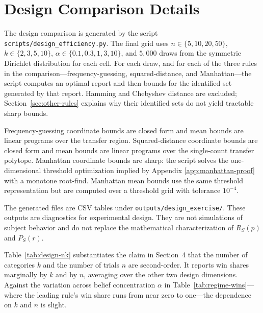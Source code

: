 \section{Design Comparison Details}
\label{app:design-details}

The design comparison is generated by the script \texttt{scripts/design\_efficiency.py}.
The final grid uses \(n\in\{5,10,20,50\}\), \(k\in\{2,3,5,10\}\), \(\alpha\in\{0.1,0.3,1,3,10\}\), and \(5{,}000\) draws from the symmetric Dirichlet distribution for each cell.
For each draw, and for each of the three rules in the comparison---frequency-guessing, squared-distance, and Manhattan---the script computes an optimal report and then bounds for the identified set generated by that report.
Hamming and Chebyshev distance are excluded; Section~\ref{sec:other-rules} explains why their identified sets do not yield tractable sharp bounds.

Frequency-guessing coordinate bounds are closed form and mean bounds are linear programs over the transfer region.
Squared-distance coordinate bounds are closed form and mean bounds are linear programs over the single-count transfer polytope.
Manhattan coordinate bounds are sharp: the script solves the one-dimensional threshold optimization implied by Appendix \ref{app:manhattan-proof} with a monotone root-find.
Manhattan mean bounds use the same threshold representation but are computed over a threshold grid with tolerance \(10^{-4}\).

The generated files are CSV tables under \texttt{outputs/design\_exercise/}.
These outputs are diagnostics for experimental design.
They are not simulations of subject behavior and do not replace the mathematical characterization of \(R_S(p)\) and \(P_S(r)\).

Table~\ref{tab:design-nk} substantiates the claim in Section~4 that the number of categories \(k\) and the number of trials \(n\) are second-order.
It reports win shares marginally by \(k\) and by \(n\), averaging over the other two design dimensions.
Against the variation across belief concentration \(\alpha\) in Table~\ref{tab:regime-wins}---where the leading rule's win share runs from near zero to one---the dependence on \(k\) and \(n\) is slight.


